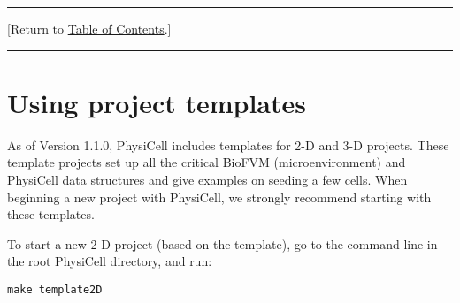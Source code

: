 \documentclass[12pt]{article}
\renewcommand{\v}{\verb}
\newcommand{\smallcode}[1]{\textbf{\texttt{#1}}}
\newcommand{\blue}[1]{\textcolor{blue}{#1}}
\newcommand{\DONE}{}%
\newcommand{\TOClink}{\begin{center}\hrule\vskip-10pt\phantom{.}\hfill[Return to \hyperlink{TOC}{Table of Contents}.]\hfill\phantom{.}\vskip3pt\hrule\end{center}}
\begin{document}
\begin{enumerate}





\end{enumerate}

\TOClink 

\section{Using project templates \DONE}
\label{sec:templates}
As of Version 1.1.0, PhysiCell includes templates for 2-D and 3-D projects. These template projects set up all 
the critical BioFVM (microenvironment) and PhysiCell data structures and give examples on seeding a few 
cells. When beginning a new project with PhysiCell, we strongly recommend starting with these templates. 

To start a new 2-D project (based on the template), go to the command line in the root PhysiCell directory, 
and run: 

\v|make template2D|
\end{document}

